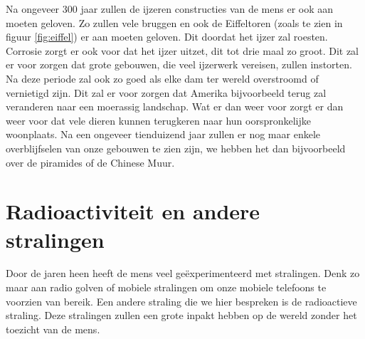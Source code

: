 \newline
Na ongeveer 300 jaar zullen de ijzeren constructies van de mens er ook aan moeten geloven. Zo zullen vele bruggen en ook de Eiffeltoren (zoals te zien in figuur \ref{fig:eiffel}) er aan moeten geloven. Dit doordat het ijzer zal roesten. Corrosie zorgt er ook voor dat het ijzer uitzet, dit tot drie maal zo groot. Dit zal er voor zorgen dat grote gebouwen, die veel ijzerwerk vereisen, zullen instorten. Na deze periode zal ook zo goed als elke dam ter wereld overstroomd of vernietigd zijn. Dit zal er voor zorgen dat Amerika bijvoorbeeld terug zal veranderen naar een moerassig landschap. Wat er dan weer voor zorgt er dan weer voor dat vele dieren kunnen terugkeren naar hun oorspronkelijke woonplaats.
\newline
Na een ongeveer tienduizend jaar zullen er nog maar enkele overblijfselen van onze gebouwen te zien zijn, we hebben het dan bijvoorbeeld over de piramides of de Chinese Muur. \cite{LAPOutbreak}

\newpage

\section{Radioactiviteit en andere stralingen}
Door de jaren heen heeft de mens veel ge\"{e}xperimenteerd met stralingen. Denk zo maar aan radio golven of mobiele stralingen om onze mobiele telefoons te voorzien van bereik. Een andere straling die we hier bespreken is de radioactieve straling. Deze stralingen zullen een grote inpakt hebben op de wereld zonder het toezicht van de mens.

